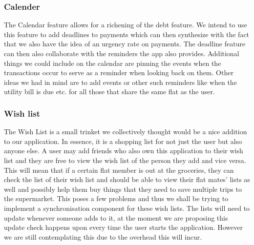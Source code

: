 \documentclass[a4paper,9t]{article}
\begin{document}
\subsubsection*{Calender}
The Calendar feature allows for a richening of the debt feature. We intend to use this feature to add deadlines to payments which can then synthesize with the fact that we also have the idea of an urgency rate on payments. The deadline feature can then also collaborate with the reminders the app also provides.
Additional things we could include on the calendar are pinning the events when the transactions occur to serve as a reminder when looking back on them. Other ideas we had in mind are to add events or other such reminders like when the utility bill is due etc. for all those that share the same flat as the user.

\subsubsection*{Wish list}
The Wish List is a small trinket we collectively thought would be a nice addition to our application. In essence, it is a shopping list for not just the user but also anyone else. A user may add friends who also own this application to their wish list and they are free to view the wish list of the person they add and vice versa. This will mean that if a certain flat member is out at the groceries, they can check the list of their wish list and should be able to view their flat mates' lists as well and possibly help them buy things that they need to save multiple trips to the supermarket.
This poses a few problems and thus we shall be trying to implement a synchronisation component for these wish lists. The lists will need to update whenever someone adds to it, at the moment we are proposing this update check happens upon every time the user starts the application. However we are still contemplating this due to the overhead this will incur.
\end{document}
